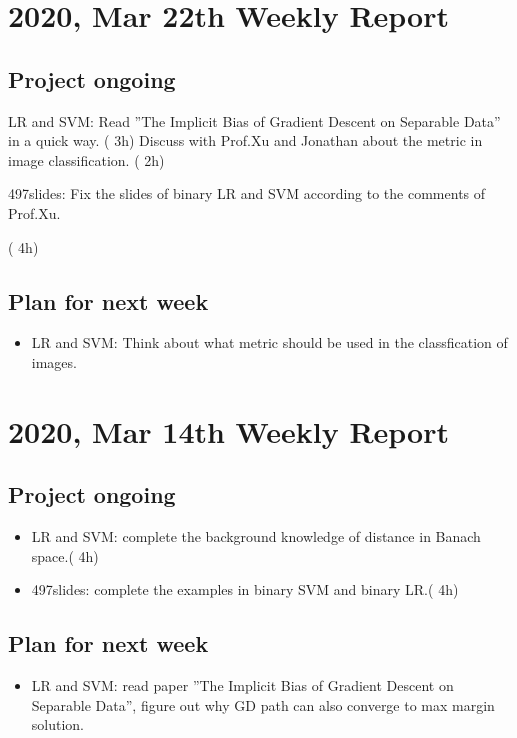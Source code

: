 \documentclass[10pt]{amsart}
\begin{document}
\section{2020, Mar 22th Weekly Report }
\subsection{Project ongoing}
\begin{itemize}
	\item LR and SVM: Read ''The Implicit Bias of Gradient Descent on Separable Data''  in a quick way. ({\color{blue} 3h}) Discuss with Prof.Xu and Jonathan about the metric in image classification. ({\color{blue} 2h})
	{\color{red} \item 497slides: Fix the slides of binary LR and SVM according to the comments of Prof.Xu.} ({\color{blue} 4h})
\end{itemize}
\subsection{Plan for next week}
\begin{itemize}
	\item LR and SVM: Think about what metric should be used in the classfication of images.
\end{itemize}


\section{2020, Mar 14th Weekly Report }
\subsection{Project ongoing}
\begin{itemize}
	\item {\color{red} LR and SVM: complete the background knowledge of distance in Banach space.}({\color{blue} 4h})
	\item {\color{red} 497slides: complete the examples in binary SVM and binary LR.}({\color{blue} 4h})
\end{itemize}
\subsection{Plan for next week}
\begin{itemize}
	\item LR and SVM: read paper ''The Implicit Bias of Gradient Descent on Separable Data'', figure out why GD path can also converge to max margin solution.
\end{itemize}
\end{document}
